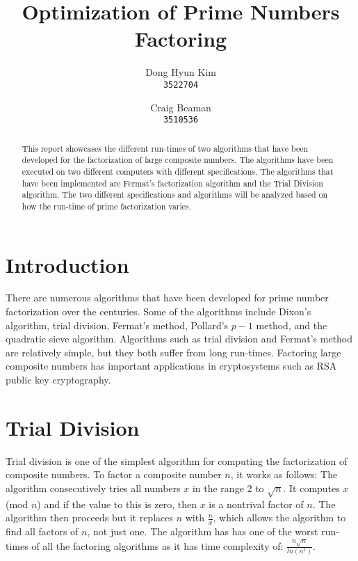 \documentclass[]{article}
\title{Optimization of Prime Numbers Factoring}
\author{
	Dong Hyun Kim\\
	\texttt{3522704}
	\and
	Craig Beaman\\
	\texttt{3510536}}
\begin{document}
	
	\maketitle
	
	\begin{abstract}
		This report showcases the different run-times of two algorithms that have been developed for the factorization of large composite numbers. The algorithms have been executed on two different computers with different specifications. The algorithms that have been implemented are Fermat's factorization algorithm and the Trial Division algorithm. The two different specifications and algorithms will be analyzed based on how the run-time of prime factorization varies.
	\end{abstract}
	
	\section{Introduction}
	There are numerous algorithms that have been developed for prime number factorization over the centuries. Some of the algorithms include Dixon's algorithm, trial division, Fermat's method, Pollard's $p-1$ method, and the quadratic sieve algorithm. Algorithms such as trial division and Fermat's method are relatively simple, but they both suffer from long run-times. Factoring large composite numbers has important applications in cryptosystems such as RSA public key cryptography.
	
	\section{Trial Division}
	Trial division is one of the simplest algorithm for computing the factorization of composite numbers. To factor a composite number $n$, it works as follows: The algorithm consecutively tries all numbers $x$ in the range $2$ to $\sqrt{n}$. It computes $x$ (mod $n$) and if the value to this is zero, then $x$ is a nontrival factor of $n$. The algorithm then proceeds but it replaces $n$ with $\frac{n}{x}$, which allows the algorithm to find all factors of $n$, not just one. The algorithm has has one of the worst run-times of all the factoring algorithms as it has time complexity of: $\frac{n\sqrt{n}}{ln(n^2)}$.
	
\end{document}
